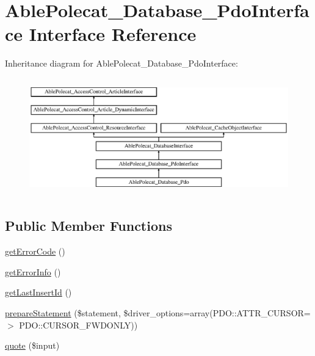 \hypertarget{interface_able_polecat___database___pdo_interface}{}\section{Able\+Polecat\+\_\+\+Database\+\_\+\+Pdo\+Interface Interface Reference}
\label{interface_able_polecat___database___pdo_interface}
Inheritance diagram for Able\+Polecat\+\_\+\+Database\+\_\+\+Pdo\+Interface\+:\begin{figure}[H]
\begin{center}
\leavevmode
\includegraphics[height=5.121951cm]{interface_able_polecat___database___pdo_interface}
\end{center}
\end{figure}
\subsection*{Public Member Functions}
\begin{DoxyCompactItemize}
\item 
\hyperlink{interface_able_polecat___database___pdo_interface_a5f04b6f467dace4e4b9a81611e658c4d}{get\+Error\+Code} ()
\item 
\hyperlink{interface_able_polecat___database___pdo_interface_aa17a52a88134e9ba51a0731ba3ba4d6f}{get\+Error\+Info} ()
\item 
\hyperlink{interface_able_polecat___database___pdo_interface_aaf8e789036f518ea4523e095d1892e34}{get\+Last\+Insert\+Id} ()
\item 
\hyperlink{interface_able_polecat___database___pdo_interface_a374c56d08c9fb9b44796f1a55512b974}{prepare\+Statement} (\$statement, \$driver\+\_\+options=array(P\+D\+O\+::\+A\+T\+T\+R\+\_\+\+C\+U\+R\+S\+O\+R=$>$ P\+D\+O\+::\+C\+U\+R\+S\+O\+R\+\_\+\+F\+W\+D\+O\+N\+L\+Y))
\item 
\hyperlink{interface_able_polecat___database___pdo_interface_ad6688f4cd3234b8d40f8f92bbcd07e73}{quote} (\$input)
\end{DoxyCompactItemize}
